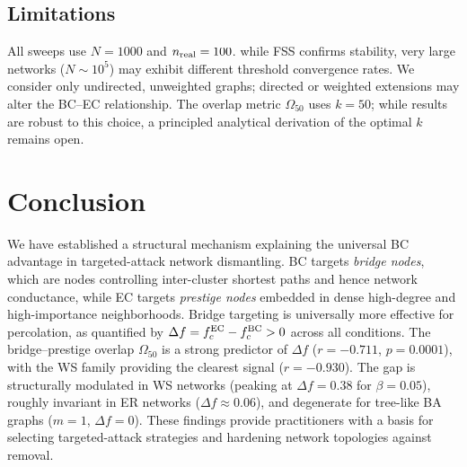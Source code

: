 \documentclass[journal]{IEEEtran}
\begin{document}
\subsection{Limitations}

All sweeps use $N = 1000$ and $n_{\rm real} = 100$. while FSS confirms
stability, very large networks ($N \sim 10^5$) may exhibit different
threshold convergence rates.
We consider only undirected, unweighted graphs; directed or weighted extensions
may alter the BC--EC relationship.
The overlap metric $\Omega_{50}$ uses $k = 50$; while results are robust to
this choice, a principled analytical derivation of the optimal $k$ remains
open.

\section{Conclusion}

We have established a structural mechanism explaining the universal BC advantage
in targeted-attack network dismantling.
BC targets \emph{bridge nodes}, which are nodes controlling inter-cluster shortest paths
and hence network conductance, while EC targets \emph{prestige nodes} embedded
in dense high-degree and high-importance neighborhoods.
Bridge targeting is universally more effective for percolation, as quantified
by $\Delta f = f_c^{\rm EC} - f_c^{\rm BC} > 0$ across all conditions.
The bridge--prestige overlap $\Omega_{50}$ is a strong predictor of $\Delta f$
($r = -0.711$, $p = 0.0001$), with the WS family providing the clearest signal
($r = -0.930$).
The gap is structurally modulated in WS networks (peaking at $\Delta f = 0.38$
for $\beta = 0.05$), roughly invariant in ER networks
($\Delta f \approx 0.06$), and degenerate for tree-like BA graphs ($m = 1$,
$\Delta f = 0$).
These findings provide practitioners with a basis for selecting
targeted-attack strategies and hardening network topologies against removal.
\end{document}
